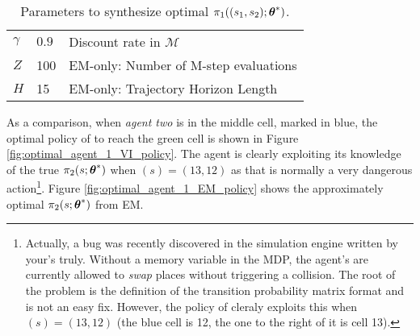 \begin{table}[htb]
        \centering
        \begin{tabular}{l|l l}
                $\gamma$ & $0.9$ & Discount rate in $\mathcal{M}$ \\
                $Z$ & 100 & EM-only: Number of M-step evaluations \\
                $H$ & 15 & EM-only: Trajectory Horizon Length \\
        \end{tabular}
        \caption{Parameters to synthesize optimal $\pi_{1}((s_1,s_2);\boldsymbol{\mathbb{\theta}}^*)$.}
        \label{table:optimal_agent_1_EM_policy_params}
\end{table}
As a comparison, when \emph{agent two} is in the middle cell, marked in blue, the optimal policy of  to reach
the green cell is shown in Figure \ref{fig:optimal_agent_1_VI_policy}. The agent is clearly exploiting its knowledge of
the true $\pi_{2}(s;\boldsymbol{\mathbb{\theta}}^*)$ when $(s) = (13,12)$ as that is normally a very dangerous
action\footnote{Actually, a bug was recently discovered in the simulation engine written by your's truly. Without a
memory variable in the MDP, the agent's are currently allowed to \emph{swap} places without triggering a collision. The
root of the problem is the definition of the transition probability matrix format and is not an easy fix. However, the
policy of  cleraly exploits this when $(s) = (13,12)$ (the blue cell is 12, the one to the right of it is cell
13).}. Figure \ref{fig:optimal_agent_1_EM_policy} shows the approximately optimal $\pi_{2}(s;\boldsymbol{\mathbb{\theta}}^*)$
from EM.

    \begin{figure}[htb]
        \begin{center}
        \end{center}
\end{figure}

    \begin{figure}[htb]
        \begin{center}
        \end{center}
\end{figure}

